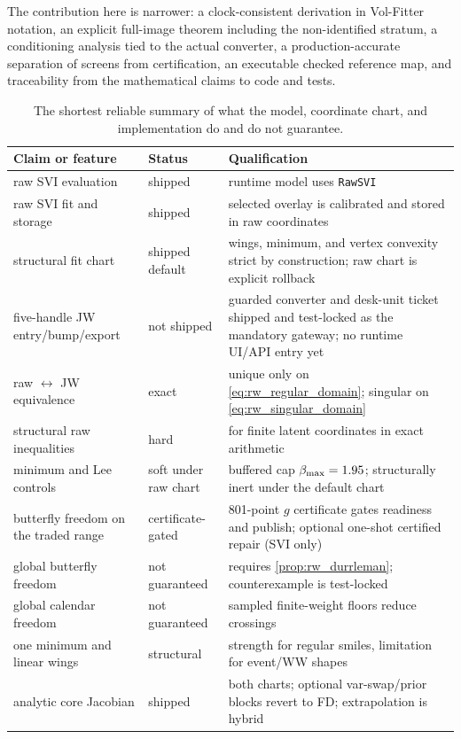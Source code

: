 \documentclass[11pt]{article}
\begin{document}
The contribution here is narrower: a clock-consistent derivation in Vol-Fitter
notation, an explicit full-image theorem including the non-identified stratum,
a conditioning analysis tied to the actual converter, a production-accurate
separation of screens from certification, an executable checked reference map,
and traceability from the mathematical claims to code and tests.

\begin{table}[H]
\centering
\small
\begin{tabular}{@{}p{}p{}p{}@{}}
\toprule
Claim or feature & Status & Qualification\\
\midrule
raw SVI evaluation & shipped & runtime model uses \texttt{RawSVI}\\
raw SVI fit and storage & shipped & selected overlay is calibrated and stored in raw coordinates\\
structural fit chart & shipped default & wings, minimum, and vertex convexity strict by construction; raw chart is explicit rollback\\
five-handle JW entry/bump/export & not shipped & guarded converter and desk-unit ticket shipped and test-locked as the mandatory gateway; no runtime UI/API entry yet\\
raw $\leftrightarrow$ JW equivalence & exact & unique only on \eqref{eq:rw_regular_domain}; singular on \eqref{eq:rw_singular_domain}\\
structural raw inequalities & hard & for finite latent coordinates in exact arithmetic\\
minimum and Lee controls & soft under raw chart & buffered cap $\beta_{\max}=1.95$; structurally inert under the default chart\\
butterfly freedom on the traded range & certificate-gated & 801-point $g$ certificate gates readiness and publish; optional one-shot certified repair (SVI only)\\
global butterfly freedom & not guaranteed & requires \cref{prop:rw_durrleman}; counterexample is test-locked\\
global calendar freedom & not guaranteed & sampled finite-weight floors reduce crossings\\
one minimum and linear wings & structural & strength for regular smiles, limitation for event/WW shapes\\
analytic core Jacobian & shipped & both charts; optional var-swap/prior blocks revert to FD; extrapolation is hybrid\\
\bottomrule
\end{tabular}
\caption{The shortest reliable summary of what the model, coordinate chart,
and implementation do and do not guarantee.}
\label{tab:rw_contract}
\end{table}
\end{document}
